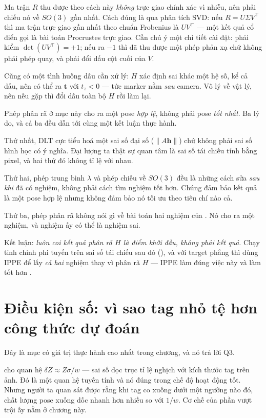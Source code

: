 \documentclass[../../marker.tex]{subfiles}
\begin{document}
Ma trận \(R\) thu được theo cách này \emph{không} trực giao chính xác vì nhiễu, nên phải chiếu nó về \(SO(3)\) gần nhất. Cách đúng là qua phân tích SVD: nếu \(R = U\Sigma V^\top\) thì ma trận trực giao gần nhất theo chuẩn Frobenius là \(UV^\top\) --- một kết quả cổ điển gọi là bài toán Procrustes trực giao. Cần chú ý một chi tiết cài đặt: phải kiểm \(\det(UV^\top) = +1\); nếu ra \(-1\) thì đã thu được một phép phản xạ chứ không phải phép quay, và phải đổi dấu cột cuối của \(V\).

Cũng có một tình huống dấu cần xử lý: \(H\) xác định sai khác một hệ số, kể cả dấu, nên có thể ra \(\mathbf{t}\) với \(t_z < 0\) --- tức marker nằm \emph{sau} camera. Vô lý về vật lý, nên nếu gặp thì đổi dấu toàn bộ \(H\) rồi làm lại.

\begin{cambay}
Phép phân rã ở mục này cho ra một pose \emph{hợp lệ}, không phải pose \emph{tốt nhất}. Ba lý do, và cả ba đều dẫn tới cùng một kết luận thực hành.

Thứ nhất, DLT cực tiểu hoá một sai số đại số (\(\|A\mathbf{h}\|\)) chứ không phải sai số hình học có ý nghĩa. Đại lượng ta thật sự quan tâm là sai số tái chiếu tính bằng pixel, và hai thứ đó không tỉ lệ với nhau.

Thứ hai, phép trung bình \(\lambda\) và phép chiếu về \(SO(3)\) đều là những cách sửa \emph{sau khi} đã có nghiệm, không phải cách tìm nghiệm tốt hơn. Chúng đảm bảo kết quả là một pose hợp lệ nhưng không đảm bảo nó tối ưu theo tiêu chí nào cả.

Thứ ba, phép phân rã không nói gì về bài toán hai nghiệm của . Nó cho ra một nghiệm, và nghiệm ấy có thể là nghiệm sai.

Kết luận: \emph{luôn coi kết quả phân rã \(H\) là điểm khởi đầu, không phải kết quả}. Chạy tinh chỉnh phi tuyến trên sai số tái chiếu sau đó (), và với target phẳng thì dùng IPPE để lấy \emph{cả hai} nghiệm thay vì phân rã \(H\) --- IPPE làm đúng việc này và làm tốt hơn \cite{collins2014ippe}.
\end{cambay}

\section{Điều kiện số: vì sao tag nhỏ tệ hơn công thức dự đoán}

Đây là mục có giá trị thực hành cao nhất trong chương, và nó trả lời Q3.

 cho quan hệ \(\delta Z \approx Z\sigma/w\) --- sai số dọc trục tỉ lệ nghịch với kích thước tag trên ảnh. Đó là một quan hệ tuyến tính và nó đúng trong chế độ hoạt động tốt. Nhưng người ta quan sát được rằng khi tag co xuống dưới một ngưỡng nào đó, chất lượng pose xuống dốc nhanh hơn nhiều so với \(1/w\). Cơ chế của phần vượt trội ấy nằm ở chương này.
\end{document}
